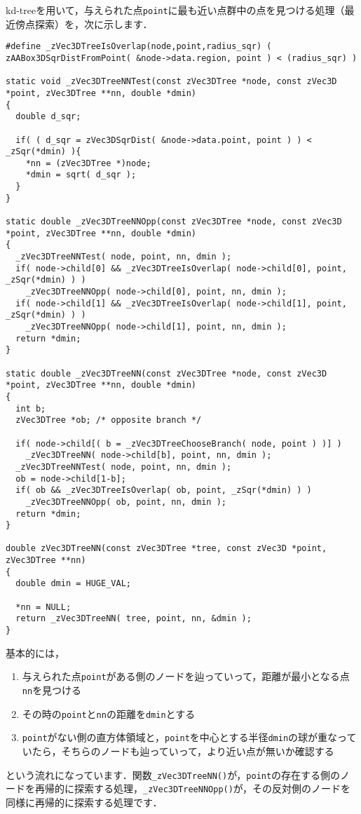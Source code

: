 ﻿\documentclass[a4paper]{jsarticle}
\begin{document}
kd-treeを用いて，与えられた点\verb|point|に最も近い点群中の点を見つける処理（最近傍点探索）を，次に示します．
\begin{screen}
\begin{verbatim}
#define _zVec3DTreeIsOverlap(node,point,radius_sqr) ( zAABox3DSqrDistFromPoint( &node->data.region, point ) < (radius_sqr) )

static void _zVec3DTreeNNTest(const zVec3DTree *node, const zVec3D *point, zVec3DTree **nn, double *dmin)
{
  double d_sqr;

  if( ( d_sqr = zVec3DSqrDist( &node->data.point, point ) ) < _zSqr(*dmin) ){
    *nn = (zVec3DTree *)node;
    *dmin = sqrt( d_sqr );
  }
}

static double _zVec3DTreeNNOpp(const zVec3DTree *node, const zVec3D *point, zVec3DTree **nn, double *dmin)
{
  _zVec3DTreeNNTest( node, point, nn, dmin );
  if( node->child[0] && _zVec3DTreeIsOverlap( node->child[0], point, _zSqr(*dmin) ) )
    _zVec3DTreeNNOpp( node->child[0], point, nn, dmin );
  if( node->child[1] && _zVec3DTreeIsOverlap( node->child[1], point, _zSqr(*dmin) ) )
    _zVec3DTreeNNOpp( node->child[1], point, nn, dmin );
  return *dmin;
}

static double _zVec3DTreeNN(const zVec3DTree *node, const zVec3D *point, zVec3DTree **nn, double *dmin)
{
  int b;
  zVec3DTree *ob; /* opposite branch */

  if( node->child[( b = _zVec3DTreeChooseBranch( node, point ) )] )
    _zVec3DTreeNN( node->child[b], point, nn, dmin );
  _zVec3DTreeNNTest( node, point, nn, dmin );
  ob = node->child[1-b];
  if( ob && _zVec3DTreeIsOverlap( ob, point, _zSqr(*dmin) ) )
    _zVec3DTreeNNOpp( ob, point, nn, dmin );
  return *dmin;
}

double zVec3DTreeNN(const zVec3DTree *tree, const zVec3D *point, zVec3DTree **nn)
{
  double dmin = HUGE_VAL;

  *nn = NULL;
  return _zVec3DTreeNN( tree, point, nn, &dmin );
}
\end{verbatim}
\end{screen}
基本的には，
\begin{enumerate}
\item 与えられた点\verb|point|がある側のノードを辿っていって，距離が最小となる点\verb|nn|を見つける
\item その時の\verb|point|と\verb|nn|の距離を\verb|dmin|とする
\item \verb|point|がない側の直方体領域と，\verb|point|を中心とする半径\verb|dmin|の球が重なっていたら，そちらのノードも辿っていって，より近い点が無いか確認する
\end{enumerate}
という流れになっています．関数\verb|_zVec3DTreeNN()|が，\verb|point|の存在する側のノードを再帰的に探索する処理，\verb|_zVec3DTreeNNOpp()|が，その反対側のノードを同様に再帰的に探索する処理です．
\end{document}
